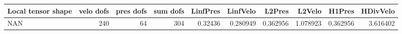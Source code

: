 \begin{tabular}{lrrrrrrrrr}
\toprule
Local tensor shape &  velo dofs &  pres dofs &  sum dofs &  LinfPres &  LinfVelo &   L2Pres &   L2Velo &   H1Pres &  HDivVelo \\
\midrule
               NAN &        240 &         64 &       304 &   0.32436 &  0.280949 & 0.362956 & 1.078923 & 0.362956 &  3.616402 \\
\bottomrule
\end{tabular}
